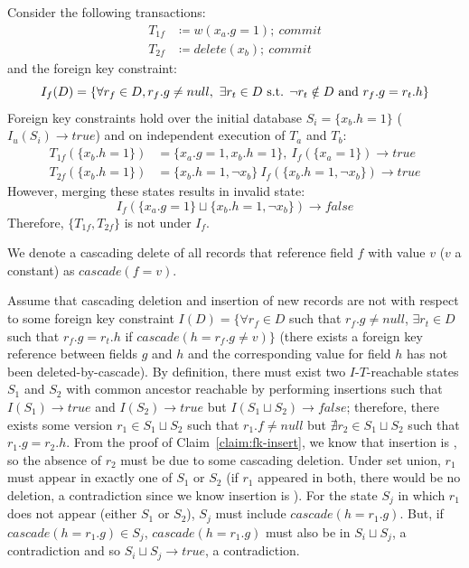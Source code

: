 \begin{claim}
\label{claim:fk-delete}
 Consider the following transactions:
\begin{align*}
T_{1f}&\coloneqq w(x_a.g=1);~commit\\
T_{2f}&\coloneqq delete(x_b);~commit
\end{align*}
and the foreign key constraint:
$$I_f(D) = \{\forall r_f \in D, r_f.g \neq null,~\exists r_t \in D \textrm{ s.t. } \neg r_t \notin D \textrm{ and } r_f.g = r_t.h\}$$
Foreign key constraints hold over the initial database $S_i=\{x_b.h=1\}$ ($I_u(S_i) \rightarrow true$) and on independent execution of $T_a$ and $T_b$:
\begin{align*}
T_{1f}(\{x_b.h=1\})&=\{x_a.g=1, x_b.h=1\},~I_f(\{x_a=1\}) \rightarrow true\\
T_{2f}(\{x_b.h=1\})&=\{x_b.h=1, \neg {x_b}\}~I_f(\{x_b.h=1, \neg {x_b}\}) \rightarrow true
\end{align*}
However, merging these states results in invalid state: 
$$I_f(\{x_a.g=1\}\sqcup \{x_b.h=1, \neg {x_b}\}) \rightarrow false$$
Therefore, $\{T_{1f}, T_{2f}\}$ is not \iconfluent under $I_f$.\end{claim}

We denote a cascading delete of all records that reference field $f$ with value $v$ ($v$ a constant) as $cascade(f=v)$.

\begin{claim}
\label{claim:fk-cascade}
Assume that cascading deletion and insertion of new records are not \iconfluent with respect to some foreign key constraint $I(D) = \{\forall r_f \in D$ such that $r_f.g \neq null$, $\exists r_t \in D$ such that $r_f.g = r_t.h$ if $cascade(h=r_f.g \neq v)\}$ (there exists a foreign key reference between fields $g$ and $h$ and the corresponding value for field $h$ has not been deleted-by-cascade). By definition, there must exist two $I$-$T$-reachable states $S_1$ and $S_2$ with common ancestor reachable by performing insertions such that $I(S_1) \rightarrow true$ and $I(S_2) \rightarrow true$ but $I(S_1 \sqcup S_2) \rightarrow false$; therefore, there exists some version $r_1 \in S_1 \sqcup S_2$ such that $r_1.f \neq null$ but $\nexists r_2 \in S_1 \sqcup S_2$ such that $r_1.g = r_2.h$. From the proof of Claim~\ref{claim:fk-insert}, we know that insertion is \iconfluent, so the absence of $r_2$ must be due to some cascading deletion. Under set union, $r_1$ must appear in exactly one of $S_1$ or $S_2$ (if $r_1$ appeared in both, there would be no deletion, a contradiction since we know insertion is \iconfluent). For the state $S_j$ in which $r_1$ does not appear (either $S_1$ or $S_2$), $S_j$ must include $cascade(h=r_1.g)$. But, if $cascade(h=r_1.g) \in S_j$, $cascade(h=r_1.g)$ must also be in $S_i \sqcup S_j$, a contradiction and so $S_i \sqcup S_j \rightarrow true$, a contradiction.
\end{claim}

